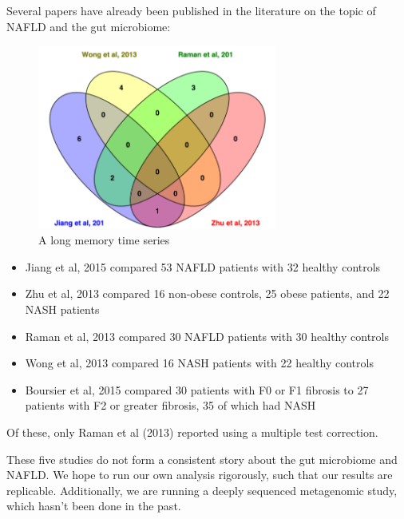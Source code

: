 Several papers have already been published in the literature on the topic of NAFLD and the gut microbiome:

\begin{figure}[h]
\begin{center}
\includegraphics[width=0.7\textwidth]{nafld_papers.png}
\caption{A long memory time series\label{ts1}}
\end{center}
\end{figure}

\begin{itemize}
\item Jiang et al, 2015 compared 53 NAFLD patients with 32 healthy controls

\item Zhu et al, 2013 compared 16 non-obese controls, 25 obese patients, and 22 NASH patients

\item Raman et al, 2013 compared 30 NAFLD patients with 30 healthy controls

\item Wong et al, 2013 compared 16 NASH patients with 22 healthy controls

\item Boursier et al, 2015 compared 30 patients with F0 or F1 fibrosis to 27 patients with F2 or greater fibrosis, 35 of which had NASH
\end{itemize}

Of these, only Raman et al (2013) reported using a multiple test correction.

These five studies do not form a consistent story about the gut microbiome and NAFLD. We hope to run our own analysis rigorously, such that our results are replicable. Additionally, we are running a deeply sequenced metagenomic study, which hasn’t been done in the past.

